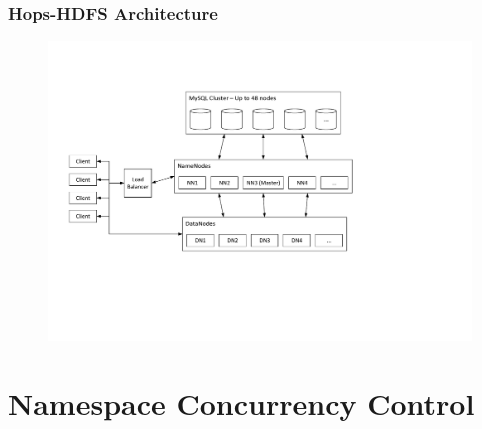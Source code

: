 \documentclass{beamer}
\begin{document}
\begin{frame}
	\frametitle{Hops-HDFS Architecture}
	\begin{figure}[h!]
		\centering
		\includegraphics[width=\linewidth]{figs/HopHDFSArchitecture.pdf}
	\end{figure}
\end{frame}
\section{Namespace Concurrency Control}
\end{document}
